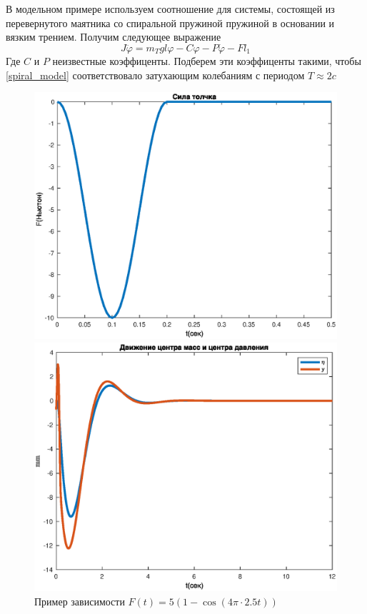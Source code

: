 \documentclass[a4paper,12pt, openany]{book}
\theoremstyle{plain} %
\theoremstyle{definition} %
\theoremstyle{remark} %
\numberwithin{equation}{chapter}
\begin{document}
{В модельном примере используем соотношение для системы, состоящей из перевернутого маятника со спиральной пружиной пружиной в основании и вязким трением.
Получим следующее выражение
\begin{equation}\label{spiral_model}
    J\ddot{\varphi}=m_Tgl\varphi-C\varphi-P\dot\varphi-Fl_1
\end{equation}
Где $C$ и $P$ неизвестные коэффиценты.
Подберем эти коэффиценты такими, чтобы \eqref{spiral_model} соответствовало затухающим колебаниям
с периодом $T\approx2c$
\begin{figure}[h!]
    \begin{center}
        \begin{minipage}[h]{0.48\linewidth}
            \includegraphics[width=1\linewidth]{push_model.eps}
            \caption{Пример зависимости \break $F(t)=5(1-\cos(4\pi\cdot2.5t))$}
        \end{minipage}
        \hfill
        \begin{minipage}[h]{0.48\linewidth}
            \includegraphics[width=1\linewidth]{eta_model.eps}

\end{minipage}
\end{center}
\end{figure}}
\end{document}
